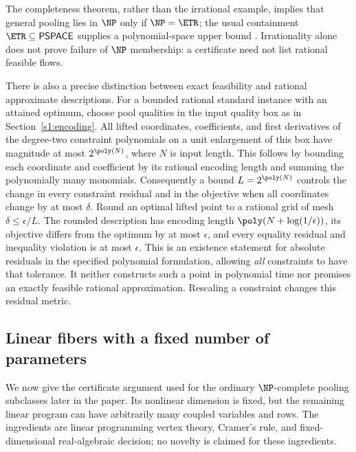 The completeness theorem, rather than the irrational example, implies
that general pooling lies in $\NP$ only if $\NP=\ETR$;
the usual containment $\ETR\subseteq\mathsf{PSPACE}$ supplies a
polynomial-space upper bound
\citep[Section~1.1]{abrahamsen2019-dynamic-toolbox-for-etrinv}.
Irrationality alone does not prove failure of $\NP$ membership:
a certificate need not list rational feasible flows.

There is also a precise distinction between exact feasibility and
rational approximate descriptions. For a bounded rational standard
instance with an attained optimum, choose pool qualities in the input
quality box as in Section~\ref{s1:encoding}. All lifted coordinates,
coefficients, and first derivatives of the degree-two constraint
polynomials on a unit enlargement of this box have magnitude at most
$2^{\poly(N)}$, where $N$ is input length. This follows by bounding
each coordinate and coefficient by its rational encoding length and
summing the polynomially many monomials. Consequently a bound
$L=2^{\poly(N)}$ controls the change in every constraint residual and
in the objective when all coordinates change by at most $\delta$.
Round an optimal lifted point to a rational grid of mesh
$\delta\le\epsilon/L$. The rounded description has encoding length
$\poly(N+\log(1/\epsilon))$, its objective differs from the optimum
by at most $\epsilon$, and every equality residual and inequality
violation is at most $\epsilon$. This is an existence statement for
absolute residuals in the specified polynomial formulation, allowing
\emph{all} constraints to have that tolerance. It neither constructs
such a point in polynomial time nor promises an exactly feasible
rational approximation. Rescaling a constraint changes this residual
metric.

\subsection{Linear fibers with a fixed number of parameters}\label{s2:fibers}

We now give the certificate argument used for the ordinary
$\NP$-complete pooling subclasses later in the paper. Its nonlinear
dimension is fixed, but the remaining linear program can have
arbitrarily many coupled variables and rows. The ingredients are
linear programming vertex theory, Cramer's rule, and fixed-dimensional
real-algebraic decision; no novelty is claimed for these ingredients.

